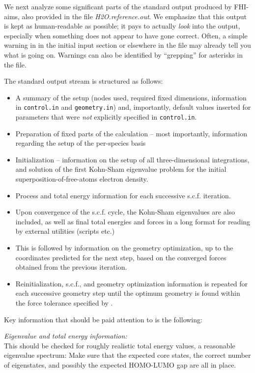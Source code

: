 We next analyze some significant parts of the standard output
produced by FHI-aims, also provided in the file
\emph{H2O.reference.out}. We emphasize that this output is kept as
human-readable as possible; it pays to actually \emph{look} into the
output, especially when something does not appear to have gone
correct. Often, a simple warning in in the initial input section or
elsewhere in the file may already tell you what is going on. Warnings can also
be identified by ``grepping'' for asterisks in the file.

The standard output stream is structured as follows:
\begin{itemize}
  \item A summary of the setup (nodes used, required fixed dimensions,
    information in \texttt{control.in} and \texttt{geometry.in}) and,
    importantly, default values inserted for parameters that were
    \emph{not} explicitly specified in \texttt{control.in}.
  \item Preparation of fixed parts of the calculation -- most
    importantly, information regarding the setup of the per-species
    basis 
  \item Initialization -- information on the setup of all
    three-dimensional integrations, and solution of the first
    Kohn-Sham eigenvalue problem for the initial
    superposition-of-free-atoms electron density.
  \item Process and total energy information for each successive
    s.c.f. iteration.
  \item Upon convergence of the s.c.f. cycle, the Kohn-Sham
    eigenvalues are also included, as well as final total energies and
    forces in a long format for reading by external utilities (scripts
    etc.) 
  \item This is followed by information on the geometry optimization,
    up to the coordinates predicted for the next step, based on the
    converged forces obtained from the previous iteration. 
  \item Reinitialization, s.c.f., and geometry optimization
    information is repeated for each successive geometry step until
    the optimum geometry is found within the force tolerance specified
    by .
\end{itemize}

Key information that should be paid attention to is the following:

\emph{Eigenvalue and total energy information:} \\
This should be checked for roughly realistic total energy values, a
reasonable eigenvalue spectrum: Make sure that the expected core
states, the correct number of eigenstates, and possibly the expected
HOMO-LUMO gap are all in place.

